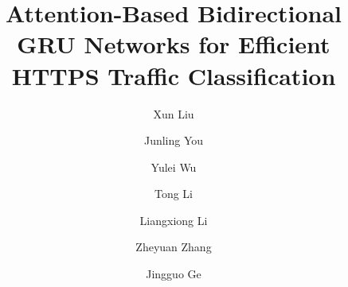 \documentclass[preprint,12pt]{elsarticle}
\begin{document}
\begin{frontmatter}


\title{Attention-Based Bidirectional GRU Networks for Efficient HTTPS Traffic Classification}




\author[1,2]{Xun Liu}

\author[1]{Junling You
}

\author[3]{Yulei Wu
}

\author[1]{Tong Li}

\author[1]{Liangxiong Li}

\author[1,2]{Zheyuan Zhang}

\author[1,2]{Jingguo Ge}






\address[1]{Institute of Information Engineering, Chinese Academy of Sciences, Beijing, China}
\address[2]{School of Cyber Security, University of Chinese Academy of Sciences, Beijing, China}
\address[3]{College of Engineering, Mathematics and Physical Sciences, University of Exeter, Exeter, EX4 4QF, UK}







\end{frontmatter}
\end{document}
